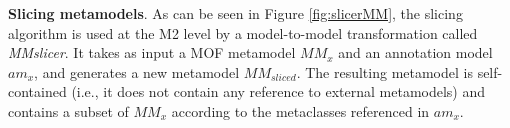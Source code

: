 \textbf{Slicing metamodels}. As can be seen in Figure \ref{fig:slicerMM}, the slicing algorithm is used at the M2 level by a model-to-model transformation called \textit{MMslicer}.
It takes as input a MOF metamodel $MM_x$ and an annotation model $am_x$, and generates a new metamodel $MM_{sliced}$.
The resulting metamodel is self-contained (i.e., it does not contain any reference to external metamodels)
and contains a subset of $MM_x$ according to the metaclasses referenced in $am_x$.

%
\vspace{-.3cm}
